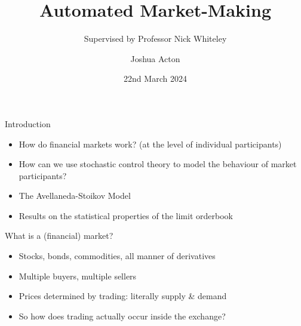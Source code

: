 \documentclass{beamer} %
\title{Automated Market-Making}
\author{Joshua Acton}
\date{22nd March 2024}
\subtitle{Supervised by Professor Nick Whiteley}
\begin{document}
\begin{frame}
    \titlepage
\end{frame}

\begin{frame}{Introduction}
    \begin{itemize}
    \item How do financial markets work? (at the level of individual participants)
    \item How can we use stochastic control theory to model the behaviour of market participants?
    \item The Avellaneda-Stoikov Model
    \item Results on the statistical properties of the limit orderbook
    \end{itemize}
\end{frame}

\begin{frame}{What is a (financial) market?}
    \begin{itemize}
        \item Stocks, bonds, commodities, all manner of derivatives
        \item Multiple buyers, multiple sellers
        \item Prices determined by trading: literally supply \& demand
        \item So how does trading actually occur inside the exchange?
    \end{itemize}
\end{frame}
\end{document}
